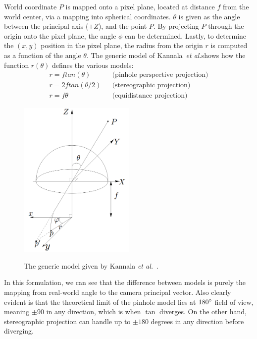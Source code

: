 \documentclass[a4paper,12pt,twoside,openright]{report}
\newcommand{\etal}{\textit{et al.}}
\begin{document}
World coordinate $P$ is mapped onto a pixel plane, located at distance $f$ from the world center,
via a mapping into spherical coordinates. $\theta$ is given as the angle between
the principal axis ($+Z$), and the point $P$. By projecting $P$ through the origin 
onto the pixel plane, the angle $\phi$ can be determined. Lastly, to determine
the $(x,y)$ position in the pixel plane, the radius from the origin $r$ is computed
as a function of the angle $\theta$. The generic model of Kannala~\etal shows 
how the function $r(\theta)$ defines the various models:
% 
\begin{subequations}
\begin{align}\label{eq:perspective projection}
    r = f tan(\theta)       &&\text{(pinhole perspective projection)} \\
    r = 2f tan(\theta/2)    &&\text{(stereographic projection)} \\
    r = f \theta            &&\text{(equidistance projection)} 
\end{align}
\end{subequations}

\begin{figure}
    \caption{The generic model given by Kannala \etal~\cite{kannala2006generic}.}
    \includegraphics[width=0.5\textwidth]{figures/camera/generic_model.png}
    \label{fig:camera:generic}
\end{figure}

In this formulation, we can see that the difference between models is purely
the mapping from real-world angle to the camera principal vector. Also 
clearly evident is that the theoretical limit of the pinhole model lies at
$180\degree$ field of view, meaning $\pm90$ in any direction, which is when
$\tan$ diverges. On the other hand, stereographic projection can handle up to
$\pm180$ degrees in any direction before diverging.
\end{document}
